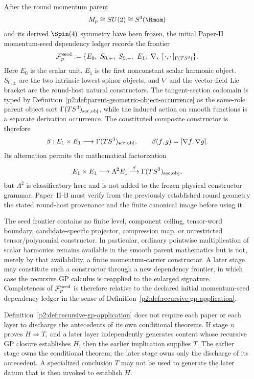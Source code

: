 \documentclass[12pt,a4paper]{article}
\begin{document}
\begin{definition}
\label{p2:def:momentum-seed-frontier}
After the round momentum parent
\[
 M_p\cong SU(2)\cong S^3(\Rmom)
\]
and its derived \(\Spin(4)\) symmetry have been frozen, the initial Paper-II
momentum-seed dependency ledger records the frontier
\[
 \mathcal F_p^{\rm seed}
 :=\{E_0,\ S_{0,+},\ S_{0,-},\ E_1,
       \ \nabla,\ [\,\cdot,\cdot\,]_{\Gamma(TS^3)}\}.
\]
Here \(E_0\) is the scalar unit, \(E_1\) is the first nonconstant scalar
harmonic object, \(S_{0,\pm}\) are the two intrinsic lowest spinor
objects, and \(\nabla\) and the vector-field Lie bracket are the round-host
natural constructors.  The tangent-section codomain is typed by
Definition~\ref{p2:def:parent-geometric-object-occurrence} as the same-role
parent object sort \(\Gamma(TS^3)_{\rm sec,obj}\), while the induced action on
smooth functions is a separate derivation occurrence.  The constituted
composite constructor is therefore
\[
 \beta:E_1\times E_1\longrightarrow\Gamma(TS^3)_{\rm sec,obj},\qquad
 \beta(f,g)=[\nabla f,\nabla g].
\]
Its alternation permits the mathematical factorization
\[
 E_1\times E_1\longrightarrow\Lambda^2E_1
 \xrightarrow{\,\bar\beta\,}\Gamma(TS^3)_{\rm sec,obj},
\]
but \(\Lambda^2\) is classificatory here and is not added to the frozen
physical constructor grammar.  Paper~II-B must verify from the previously
established round geometry the stated round-host provenance and the finite
canonical image before using it.

The seed frontier contains no finite level, component ceiling, tensor-word
boundary, candidate-specific projector, compression map, or unrestricted
tensor/polynomial constructor.  In particular, ordinary pointwise
multiplication of scalar harmonics remains available in the smooth parent
mathematics but is not, merely by that availability, a finite momentum-carrier
constructor.  A later stage may constitute such a constructor through a new
dependency frontier, in which case the recursive GP calculus is reapplied to
the enlarged signature.  Completeness of \(\mathcal F_p^{\rm seed}\) is
therefore relative to the declared initial momentum-seed dependency ledger in
the sense of Definition~\ref{p2:def:recursive-gp-application}.
\end{definition}

\begin{remark}
\label{p2:rem:recursive-gp-discharge}
Definition~\ref{p2:def:recursive-gp-application} does not require each paper
or each layer to discharge the antecedents of its own conditional theorems.
If stage \(n\) proves \(H\Rightarrow T\), and a later layer independently
generates content whose recursive GP closure establishes \(H\), then the
earlier implication supplies \(T\).  The earlier stage owns the conditional
theorem; the later stage owns only the discharge of its antecedent.  A
specialized conclusion \(T\) may not be used to generate the later datum that
is then invoked to establish \(H\).
\end{remark}
\end{document}
